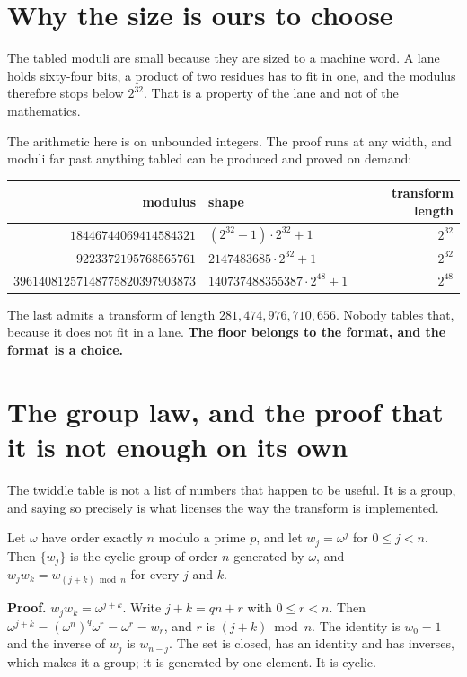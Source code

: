 \section{Why the size is ours to choose}

The tabled moduli are small because they are sized to a machine word. A lane holds sixty-four bits, a product of two residues has to fit in one, and the modulus therefore stops below \(2^{32}\). That is a property of the lane and not of the mathematics.

The arithmetic here is on unbounded integers. The proof runs at any width, and moduli far past anything tabled can be produced and proved on demand:

\begin{center}
\begin{tabular}{@{}rlr@{}}
\toprule
modulus & shape & transform length \\
\midrule
\(18446744069414584321\) & \((2^{32}-1) \cdot 2^{32} + 1\) & \(2^{32}\) \\
\(9223372195768565761\) & \(2147483685 \cdot 2^{32} + 1\) & \(2^{32}\) \\
\(39614081257148775820397903873\) & \(140737488355387 \cdot 2^{48} + 1\) & \(2^{48}\) \\
\bottomrule
\end{tabular}
\end{center}

The last admits a transform of length \(281{,}474{,}976{,}710{,}656\). Nobody tables that, because it does not fit in a lane. \textbf{The floor belongs to the format, and the format is a choice.}

\section{The group law, and the proof that it is not enough on its own}

The twiddle table is not a list of numbers that happen to be useful. It is a group, and saying so precisely is what licenses the way the transform is implemented.

\begin{proposition}
Let \(\omega\) have order exactly \(n\) modulo a prime \(p\), and let \(w_j = \omega^j\) for \(0 \le j < n\). Then \(\{w_j\}\) is the cyclic group of order \(n\) generated by \(\omega\), and \(w_j w_k = w_{(j+k) \bmod n}\) for every \(j\) and \(k\).
\end{proposition}

\textbf{Proof.} \(w_j w_k = \omega^{j+k}\). Write \(j + k = qn + r\) with \(0 \le r < n\). Then \(\omega^{j+k} = (\omega^n)^q \omega^r = \omega^r = w_r\), and \(r\) is \((j+k) \bmod n\). The identity is \(w_0 = 1\) and the inverse of \(w_j\) is \(w_{n-j}\). The set is closed, has an identity and has inverses, which makes it a group; it is generated by one element. It is cyclic. \qedsymbol

